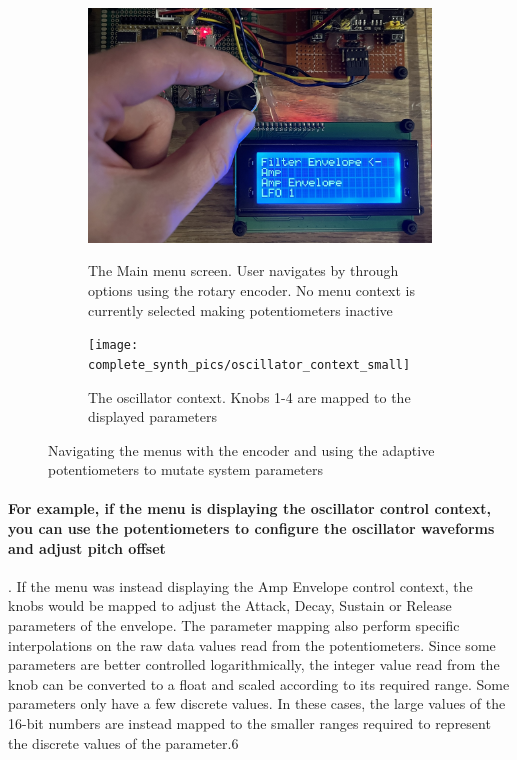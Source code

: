 \documentclass[acmlarge,screen]{acmart}
\begin{document}
	\begin{figure}[H]
		\centering
		\begin{subfigure}{.5\textwidth}
			\centering
			\caption{The Main menu screen. User navigates by through options using the rotary encoder. No menu context is currently selected making potentiometers inactive}
			\includegraphics[width=.9\linewidth]{complete_synth_pics/menu_navigation}
			\label{fig:sub1}
		\end{subfigure}%
		\begin{subfigure}{.5\textwidth}
			\centering
			\caption{The oscillator context. Knobs 1-4 are mapped to the displayed parameters}
			\texttt{[image: complete\_synth\_pics/oscillator\_context\_small]}
			\label{fig:sub2}
		\end{subfigure}
		\caption{Navigating the menus with the encoder and using the adaptive potentiometers to mutate system parameters}
		\label{fig:test}
	\end{figure}	

	\paragraph{For example, if the menu is displaying the oscillator control context, you can use the potentiometers to configure the oscillator waveforms and adjust pitch offset}. If the menu was instead displaying the Amp Envelope control context, the knobs would be mapped to adjust the Attack, Decay, Sustain or Release parameters of the envelope. The parameter mapping also perform specific interpolations on the raw data values read from the potentiometers. Since some parameters are better controlled logarithmically, the integer value read from the knob can be converted to a float and scaled according to its required range. Some parameters only have a few discrete values. In these cases, the large values of the 16-bit numbers are instead mapped to the smaller ranges required to represent the discrete values of the parameter.6
\end{document}
